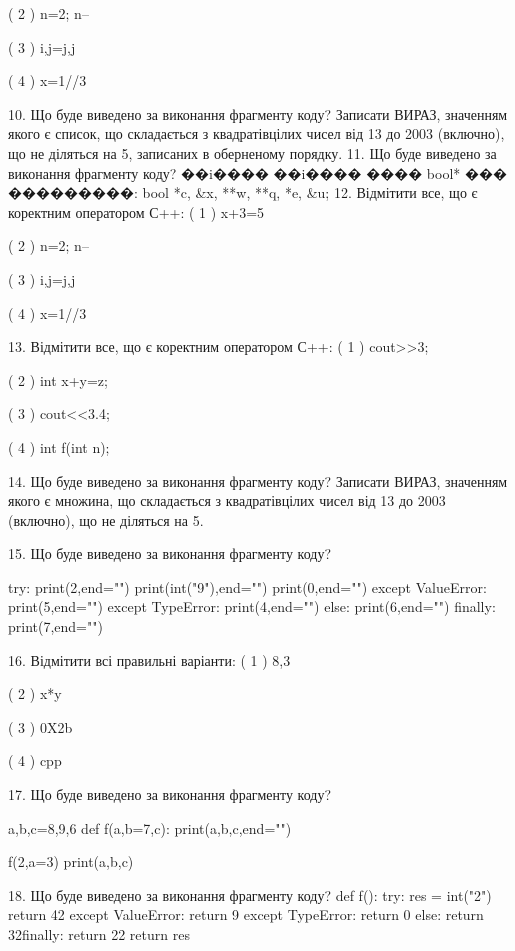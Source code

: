\documentclass[11pt]{article}
\begin{document}
( 2 ) n=2; n--

( 3 ) i,j=j,j

( 4 ) x=1//3

10. Що буде виведено за виконання фрагменту коду?
Записати ВИРАЗ, значенням якого є список, що складається з квадратівцілих чисел від 13 до 2003 (включно), що не діляться на 5, записаних в оберненому порядку.
11. Що буде виведено за виконання фрагменту коду?
��i���� ��i���� ���� bool* ��� ���������: bool *c, &x, **w, **q, *e, &u;
12. Відмітити все, що є коректним оператором С++:
( 1 ) x+3=5

( 2 ) n=2; n--

( 3 ) i,j=j,j

( 4 ) x=1//3

13. Відмітити все, що є коректним оператором С++:
( 1 ) cout>>3;

( 2 ) int x+y=z;

( 3 ) cout<<3.4;

( 4 ) int f(int n);

14. Що буде виведено за виконання фрагменту коду?
Записати ВИРАЗ, значенням якого є множина, що складається з квадратівцілих чисел від 13 до 2003 (включно), що не діляться на 5.

15. Що буде виведено за виконання фрагменту коду?

try:
    print(2,end="")
    print(int("9"),end="")
    print(0,end="")
except ValueError: print(5,end="")
except TypeError: print(4,end="")
else: print(6,end="")
finally: print(7,end="")


16. Відмітити всі правильні варіанти:
( 1 ) 8,3

( 2 ) x*y

( 3 ) 0X2b

( 4 ) cpp

17. Що буде виведено за виконання фрагменту коду?

a,b,c=8,9,6
def f(a,b=7,c):
    print(a,b,c,end="")

f(2,a=3)
print(a,b,c)


18. Що буде виведено за виконання фрагменту коду?
def f():
    try:
        res = int("2")
return 42    except ValueError: return 9
    except TypeError: return 0
else: return 32finally: return 22    return res
\end{document}
